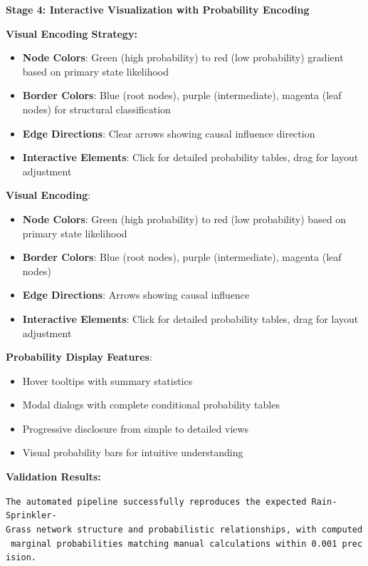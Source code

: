 \documentclass[
  11pt,
  letterpaper,
]{book}
\providecommand{\tightlist}{%
  \setlength{\itemsep}{0pt}\setlength{\parskip}{0pt}}
\begin{document}
\textbf{Stage 4: Interactive Visualization with Probability Encoding}

\textbf{Visual Encoding Strategy:}

\begin{itemize}
\tightlist
\item
  \textbf{Node Colors}: Green (high probability) to red (low
  probability) gradient based on primary state likelihood
\item
  \textbf{Border Colors}: Blue (root nodes), purple (intermediate),
  magenta (leaf nodes) for structural classification
\item
  \textbf{Edge Directions}: Clear arrows showing causal influence
  direction
\item
  \textbf{Interactive Elements}: Click for detailed probability tables,
  drag for layout adjustment
\end{itemize}

\textbf{Visual Encoding}:

\begin{itemize}
\tightlist
\item
  \textbf{Node Colors}: Green (high probability) to red (low
  probability) based on primary state likelihood
\item
  \textbf{Border Colors}: Blue (root nodes), purple (intermediate),
  magenta (leaf nodes)
\item
  \textbf{Edge Directions}: Arrows showing causal influence
\item
  \textbf{Interactive Elements}: Click for detailed probability tables,
  drag for layout adjustment
\end{itemize}

\textbf{Probability Display Features}:

\begin{itemize}
\tightlist
\item
  Hover tooltips with summary statistics
\item
  Modal dialogs with complete conditional probability tables
\item
  Progressive disclosure from simple to detailed views
\item
  Visual probability bars for intuitive understanding
\end{itemize}

\textbf{Validation Results:}

\texttt{The\ automated\ pipeline\ successfully\ reproduces\ the\ expected\ Rain-Sprinkler-Grass\ network\ structure\ and\ probabilistic\ relationships,\ with\ computed\ marginal\ probabilities\ matching\ manual\ calculations\ within\ 0.001\ precision.}
\end{document}
